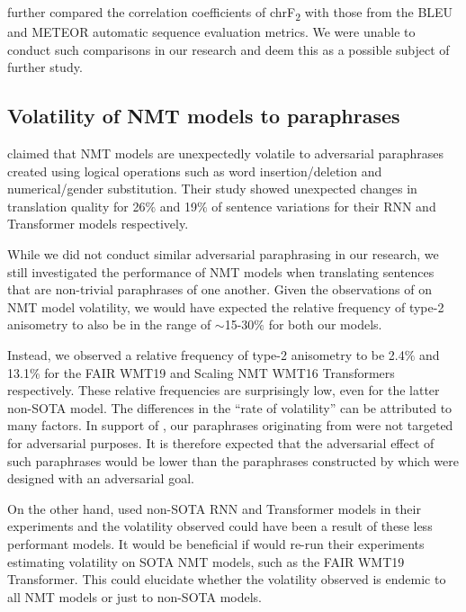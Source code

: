 \documentclass[11pt,a4paper]{article}
\begin{document}
\citet{michel2019evaluation} further compared the correlation coefficients of chrF\textsubscript{2} with those from the BLEU \cite{papineni2002bleu} and METEOR \cite{denkowski2014meteor} automatic sequence evaluation metrics. We were unable to conduct such comparisons in our research and deem this as a possible subject of further study. 

\subsection{Volatility of NMT models to paraphrases}

\citet{fadaee2020unreasonable} claimed that NMT models are unexpectedly volatile to adversarial paraphrases created using logical operations such as word insertion/deletion and numerical/gender substitution. Their study showed unexpected changes in translation quality for 26$\%$ and 19$\%$ of sentence variations for their RNN and Transformer models respectively.

While we did not conduct similar adversarial paraphrasing in our research, we still investigated the performance of NMT models when translating sentences that are non-trivial paraphrases of one another. Given the observations of \citet{fadaee2020unreasonable} on NMT model volatility, we would have expected the relative frequency of type-2 anisometry to also be in the range of $\sim$15-30$\%$ for both our models.

Instead, we observed a relative frequency of type-2 anisometry to be 2.4$\%$ and 13.1$\%$ for the FAIR WMT19 and Scaling NMT WMT16 Transformers respectively. These relative frequencies are surprisingly low, even for the latter non-SOTA model. The differences in the ``rate of volatility'' can be attributed to many factors. In support of \citet{fadaee2020unreasonable}, our paraphrases originating from \citet{freitag-bleu-paraphrase-references-2020} were not targeted for adversarial purposes. It is therefore expected that the adversarial effect of such paraphrases would be lower than the paraphrases constructed by \citet{fadaee2020unreasonable} which were designed with an adversarial goal.

On the other hand, \citet{fadaee2020unreasonable} used non-SOTA RNN and Transformer models in their experiments and the volatility observed could have been a result of these less performant models. It would be beneficial if \citet{fadaee2020unreasonable} would re-run their experiments estimating volatility on SOTA NMT models, such as the FAIR WMT19 Transformer. This could elucidate whether the volatility observed is endemic to all NMT models or just to non-SOTA models. 
\end{document}
